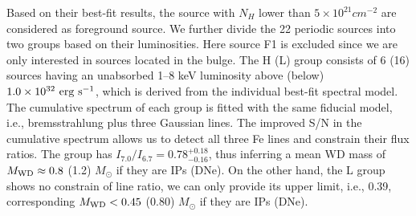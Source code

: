 \documentclass[fleqn,usenatbib]{mnras}
\begin{document}
Based on their best-fit results, the source with $N_H$ lower than $5 \times 10^{21} cm ^{-2}$ are considered as foreground source.
We further divide the 22 periodic sources into two groups based on their luminosities. Here source F1 is excluded since we are only interested in sources located in the bulge. The H (L) group consists of 6 (16) sources having an unabsorbed 1--8 keV luminosity above (below) $\rm 1.0\times10^{32}~erg ~s^{-1}$, which is derived from the individual best-fit spectral model. 
The cumulative spectrum of each group is fitted with the same fiducial model, i.e., bremsstrahlung plus three Gaussian lines. The improved S/N in the cumulative spectrum allows us to detect all three Fe lines and constrain their flux ratios.  
The group has $I_{7.0}/I_{6.7} = 0.78^{+0.18}_{-0.16}$, thus inferring a mean WD mass of $M_{\rm WD} \approx 0.8$ (1.2) $M_\odot$ if they are IPs (DNe). 
On the other hand, the L group shows no constrain of line ratio, we can only provide its upper limit, i.e., 0.39, corresponding $M_{\rm WD} < 0.45$ (0.80) $M_\odot$ if they are IPs (DNe). 
\end{document}
